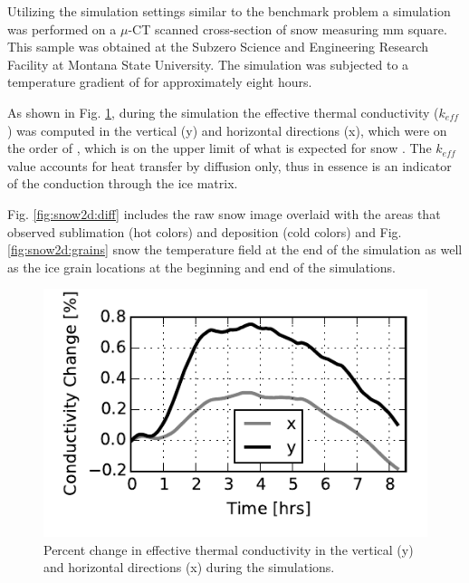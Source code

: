 Utilizing the simulation settings similar to the benchmark problem a simulation was performed on a $\mu$-CT scanned cross-section of snow measuring \unit[5]{mm} square. This sample was obtained at the Subzero Science and Engineering Research Facility at Montana State University. The simulation was subjected to a temperature gradient of  for approximately eight hours.

As shown in Fig. \ref{fig:keff}, during the simulation the effective thermal conductivity ($k_{eff}$) was computed in the vertical (y) and horizontal directions (x), which were on the order of , which is on the upper limit of what is expected for snow \citep{sturm1997thermal}. The $k_{eff}$ value accounts for heat transfer by diffusion only, thus in essence is an indicator of the conduction through the ice matrix.

Fig. \ref{fig:snow2d:diff} includes the raw snow image overlaid with the areas that observed sublimation (hot colors) and deposition (cold colors) and Fig. \ref{fig:snow2d:grains} snow the temperature field at the end of the simulation as well as the ice grain locations at the beginning and end of the simulations.

\begin{figure}
  \includegraphics[width=\linewidth]{figures/pika_keff.pdf}
  \caption{Percent change in effective thermal conductivity in the vertical (y) and horizontal directions (x) during the simulations.}
  \label{fig:keff}
\end{figure}

